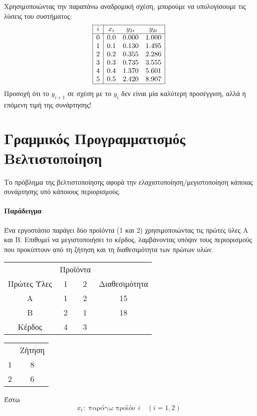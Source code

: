 \documentclass[11pt,a4paper,notitlepage,fleqn]{article}
\begin{document}
Χρησιμοποιώντας την παραπάνω αναδρομική σχέση, μπορούμε να υπολογίσουμε
τις λύσεις του συστήματος:
\[
\begin{array}{|c|ccc|}
\hline i & x_i & y_{1i} & y_{2i} \\ \hline
0 & 0.0 & 0.000 & 1.000 \\
1 & 0.1 & 0.130 & 1.495 \\
2 & 0.2 & 0.355 & 2.286 \\
3 & 0.3 & 0.735 & 3.555 \\
4 & 0.4 & 1.370 & 5.601 \\
5 & 0.5 & 2.420 & 8.907 \\ \hline
\end{array}
\]
Προσοχή ότι το \( y_{i+1} \) σε σχέση με το \( y_i \) δεν είναι μία
καλύτερη προσέγγιση, αλλά η επόμενη τιμή της συνάρτησης!

\section{Γραμμικός Προγραμματισμός\\Βελτιστοποίηση}
Το πρόβλημα της βελτιστοποίησης αφορά την ελαχιστοποίηση/μεγιστοποίηση κάποιας συνάρτησης
υπό κάποιους περιορισμούς.
\paragraph{Παράδειγμα}
Ένα εργοστάσιο παράγει δύο προϊόντα (1 και 2) χρησιμοποιώντας τις πρώτες ύλες Α και Β.
Επιθυμεί να μεγιστοποιήσει το κέρδος, λαμβάνοντας υπόψιν τους περιορισμούς που προκύπτουν
από τη ζήτηση και τη διαθεσιμότητα των πρώτων υλών.

\begin{tabular}{c|c|c|c}
	& \multicolumn{2}{c|}{Προϊόντα} &  \\ 
	Πρώτες Ύλες & 1 & 2 & Διαθεσιμότητα \\ 
	\hline 
	Α & 1 & 2 & 15 \\ 
	\hline 
	Β & 2 & 1 & 18 \\ 
	\hline 
	Κέρδος & 4 & 3 &  \\ 
\end{tabular} 
\begin{tabular}{c|c}
	& Ζήτηση \\ 
	1 & 8 \\ 
	\hline 
	2 & 6 \\ 
\end{tabular} 

Έστω
\[
x_i: \text{ παράγω προϊόν } i \quad (i=1,2)
\]
\end{document}
